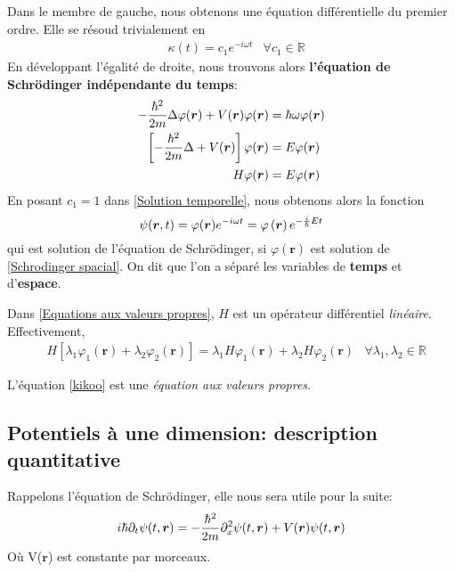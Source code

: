 \documentclass[../notesdecours]{subfiles}
\begin{document}
Dans le membre de gauche, nous obtenons une équation différentielle du premier ordre. Elle se résoud trivialement en
\begin{align}
&\kappa (t) = c_1e^{-i\omega t}    &\forall c_1 \in \mathbb{R}
\label{Solution temporelle}
\end{align}
En développant l'égalité de droite, nous trouvons alors \textbf{l'équation de Schrödinger indépendante du temps}:
\begin{align}
- \frac{\hbar^2}{2m} \Delta \varphi(\bm{r}) + V(\bm{r})\varphi(\bm{r}) &= \hbar\omega\varphi(\bm{r}) \label{Schrodinger spacial} \\
\left[ - \frac{\hbar^2}{2m} \Delta + V(\bm{r}) \right] \varphi(\bm{r}) &= E \varphi(\bm{r}) \label{Equations aux valeurs propres}\\
H \varphi(\bm{r}) &= E \varphi(\bm{r})  \label{kikoo}
\end{align}
En posant $c_1 = 1$ dans \eqref{Solution temporelle}, nous obtenons alors la fonction
\begin{equation}
\psi (\bm{r},t) = \varphi(\bm{r})e^{-i\omega t} = \varphi\left(\bm{r}\right)e^{-\frac{i}{\hbar}Et}
\label{Evolution des états}
\end{equation}
qui est solution de l'équation de Schrödinger, si $\varphi(\bm{r})$ est solution de \eqref{Schrodinger spacial}. On dit que l'on a séparé les variables de \textbf{temps} et d'\textbf{espace}.\\

\begin{remark} Dans \eqref{Equations aux valeurs propres}, $H$ est un opérateur différentiel \emph{linéaire}. Effectivement,
\begin{align}
&H \left[\lambda_1 \varphi_1(\bm{r}) + \lambda_2 \varphi_2(\bm{r})\right] = \lambda_1 H \varphi_1(\bm{r}) + \lambda_2 H \varphi_2(\bm{r})							&\forall \lambda_1,\lambda_2 \in \mathbb{R}
\end{align}
\end{remark}

\begin{remark}
    L'équation \eqref{kikoo} est une \textit{équation aux valeurs propres}.
\end{remark} 

\subsection{Potentiels à une dimension: description quantitative}

Rappelons l'équation de Schrödinger, elle nous sera utile pour la suite:
\begin{equation*}
i \hbar \partial_t \psi (t,\bm{r}) = - \frac{\hbar^2}{2m} \partial_x^2 \psi(t,\bm{r}) + V(\bm{r})\psi(t,\bm{r})
\end{equation*}
Où V($\bm{r}$) est constante par morceaux.\\
\end{document}
